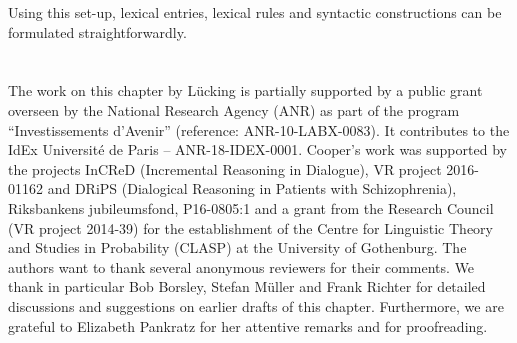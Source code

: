 \documentclass[output=paper
 	        ,biblatex
                ,babelshorthands
                ,newtxmath
                ,draftmode
                ,colorlinks, citecolor=brown
]{langscibook}
\begin{document}
\noindent
Using this set-up, lexical entries, lexical rules and syntactic constructions can be formulated straightforwardly.%


 
\section*{\acknowledgmentsUS}


The work on this chapter by Lücking is partially supported by a public grant overseen by the  National Research Agency (ANR) as part of the program ``Investissements d'Avenir'' (reference: ANR-10-LABX-0083). It contributes to the IdEx Université de Paris -- ANR-18-IDEX-0001. Cooper's work was supported by the projects InCReD (Incremental Reasoning in Dialogue), VR project 2016-01162 and DRiPS (Dialogical Reasoning in Patients with Schizophrenia), Riksbankens jubileumsfond, P16-0805:1 and a grant from the  Research Council (VR project 2014-39) for the establishment of the Centre for Linguistic Theory and Studies in Probability (CLASP) at the University of Gothenburg. The authors want to thank several anonymous reviewers for their comments. We thank in particular Bob Borsley, Stefan Müller and Frank Richter for detailed discussions and suggestions on earlier drafts of this chapter. Furthermore, we are grateful to Elizabeth Pankratz for her attentive remarks and for proofreading.


{\sloppy
\printbibliography[heading=subbibliography,notkeyword=this]
}
\end{document}
